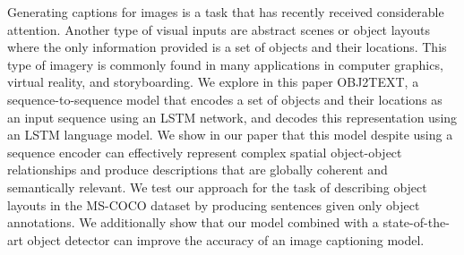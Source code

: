 Generating captions for images is a task that has recently received considerable attention. Another type of visual inputs are abstract scenes or object layouts where the only information provided is a set of objects and their locations. This type of imagery is commonly found in many applications in computer graphics, virtual reality, and storyboarding. We explore in this paper OBJ2TEXT, a sequence-to-sequence model that encodes a set of objects and their locations as an input sequence using an LSTM network, and decodes this representation using an LSTM language model. We show in our paper that this model despite using a sequence encoder can effectively represent complex spatial object-object relationships and produce descriptions that are globally coherent and semantically relevant. We test our approach for the task of describing object layouts in the MS-COCO dataset by producing sentences given only object annotations. We additionally show that our model combined with a state-of-the-art object detector can improve the accuracy of an image captioning model.
